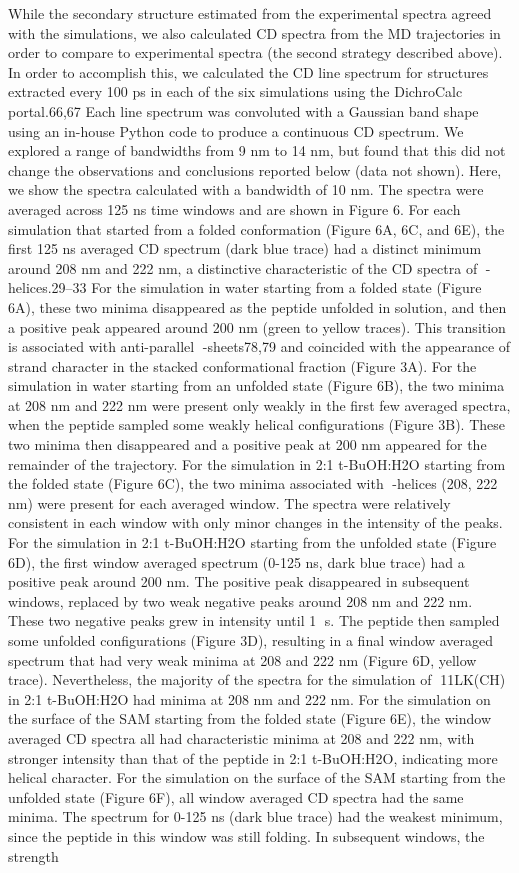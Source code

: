 While the secondary structure estimated from the experimental spectra agreed with the simulations, we also calculated CD spectra from the MD trajectories in order to compare to experimental spectra (the second strategy described above). In order to accomplish this, we calculated the CD line spectrum for structures extracted every 100 ps in each of the six simulations using the DichroCalc portal.66,67 Each line spectrum was convoluted with a Gaussian band shape using an in-house Python code to produce a continuous CD spectrum. We explored a range of bandwidths from 9 nm to 14 nm, but found that this did not change the observations and conclusions reported below (data not shown). Here, we show the spectra calculated with a bandwidth of 10 nm. The spectra were averaged across 125 ns time windows and are shown in Figure 6. For each simulation that started from a folded conformation (Figure 6A, 6C, and 6E), the first 125 ns averaged CD spectrum (dark blue trace) had a distinct minimum around 208 nm and 222 nm, a distinctive characteristic of the CD spectra of -helices.29–33 For the simulation in water starting from a folded state (Figure 6A), these two minima disappeared as the peptide unfolded in solution, and then a positive peak appeared around 200 nm (green to yellow traces). This transition is associated with anti-parallel -sheets78,79 and coincided with the appearance of strand character in the stacked conformational fraction (Figure 3A). For the simulation in water starting from an unfolded state (Figure 6B), the two minima at 208 nm and 222 nm were present only weakly in the first few averaged spectra, when the peptide sampled some weakly helical configurations (Figure 3B). These two minima then disappeared and a positive peak at 200 nm appeared for the remainder of the trajectory. For the simulation in 2:1 t-BuOH:H2O starting from the folded state (Figure 6C), the two minima associated with -helices (208, 222 nm) were present for each averaged window. The spectra were relatively consistent in each window with only minor changes in the intensity of the peaks. For the simulation in 2:1 t-BuOH:H2O starting from the unfolded state (Figure 6D), the first window averaged spectrum (0-125 ns, dark blue trace) had a positive peak around 200 nm. The positive peak disappeared in subsequent windows, replaced by two weak negative peaks around 208 nm and 222 nm. These two negative peaks grew in intensity until 1 s. The peptide then sampled some unfolded configurations (Figure 3D), resulting in a final window averaged spectrum that had very weak minima at 208 and 222 nm (Figure 6D, yellow trace). Nevertheless, the majority of the spectra for the simulation of 11LK(CH) in 2:1 t-BuOH:H2O had minima at 208 nm and 222 nm. For the simulation on the surface of the SAM starting from the folded state (Figure 6E), the window averaged CD spectra all had characteristic minima at 208 and 222 nm, with stronger intensity than that of the peptide in 2:1 t-BuOH:H2O, indicating more helical character. For the simulation on the surface of the SAM starting from the unfolded state (Figure 6F), all window averaged CD spectra had the same minima. The spectrum for 0-125 ns (dark blue trace) had the weakest minimum, since the peptide in this window was still folding. In subsequent windows, the strength 